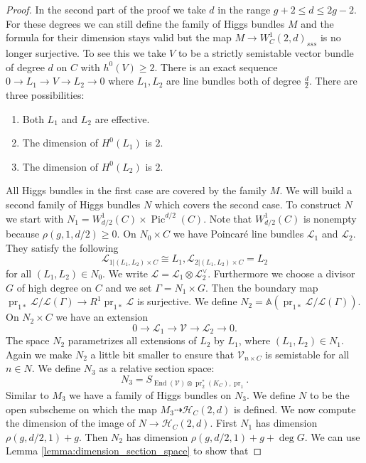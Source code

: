 \documentclass[12pt]{extarticle}
\theoremstyle{definition}
\numberwithin{theorem}{section}
\newcommand{\Aff}{\mathbb{A}}
\newcommand{\cH}{\mathcal{H}}
\newcommand{\cL}{\mathcal{L}}
\newcommand{\cV}{\mathcal{V}}
\newcommand{\op}{\operatorname}
\begin{document}
\begin{proof}
In the second part of the proof we take $d$ in the range $g+2\leq d \leq 2g-2$. For these degrees we can still define the family of Higgs bundles $M$ and the formula for their dimension stays valid but the map $M \to W_C^1(2,d)_{sss}$ is no longer surjective. To see this we take $V$ to be a strictly semistable vector bundle of degree $d$ on $C$ with $h^0(V)\geq 2$. 
There is an exact sequence $0 \to L_1 \to V \to L_2 \to 0$ where $L_1,L_2$ are line bundles both of degree $\frac{d}{2}$. There are three possibilities:
\begin{enumerate}
\item Both $L_1$ and $L_2$ are effective. 
\item The dimension of $H^0(L_1)$ is $2$.
\item The dimension of $H^0(L_2)$ is $2$.
 \end{enumerate}
All Higgs bundles in the first case are covered by the family $M$. 
We will build a second family of Higgs bundles $N$ which covers the second case. 
To construct $N$ we start with $N_1 = W^1_{d/2}(C)\times \op{Pic}^{d/2}(C)$. Note that $W^1_{d/2}(C)$ is nonempty because $\rho(g,1,d/2) \geq 0$. On $N_0\times C$ we have Poincaré line bundles $\cL_1$ and $\cL_2$. They satisfy the following 
\begin{equation*}
\cL_{1|(L_1,L_2)\times C} \cong L_1, \cL_{2|(L_1,L_2)\times C} = L_2
\end{equation*} 
for all $(L_1,L_2) \in N_0$. We write $\cL = \cL_1 \otimes \cL_2^\vee$. Furthermore we choose a divisor $G$ of high degree on $C$ and we set $\Gamma = N_1\times G$. Then the boundary map $\op{pr}_{1*}\cL/\cL(\Gamma) \to R^1\op{pr}_{1*}\cL$ is surjective. We define $N_2 = \Aff(\op{pr}_{1*}\cL/\cL(\Gamma))$. On $N_2 \times C$ we have an extension 
\begin{equation*}
0 \to \cL_1 \to \cV \to \cL_2 \to 0.
\end{equation*}
The space $N_2$ parametrizes all extensions of $L_2$ by $L_1$, where $(L_1,L_2) \in N_1$. Again we make $N_2$ a little bit smaller to ensure that $\cV_{n\times C}$ is semistable for all $n\in N$. We define $N_3 $ as a relative section space:
\begin{equation}
N_3 = S_{\op{End}(\cV)\otimes \op{pr}_2^*(K_C),\op{pr}_1}.
\end{equation} 
Similar to $M_3$ we have a family of Higgs bundles on $N_3$. We define $N$ to be the open subscheme on which the map $M_3 \dashrightarrow \cH_C(2,d)$ is defined. 
We now compute the dimension of the image of $N \to \mathcal{H}_C(2,d)$. First $N_1$ has dimension $\rho(g,d/2,1) + g$. Then $N_2 $ has dimension $\rho(g,d/2,1) + g +\deg G$. We can use Lemma \ref{lemma:dimension_section_space} to show that

\end{proof}
\end{document}
